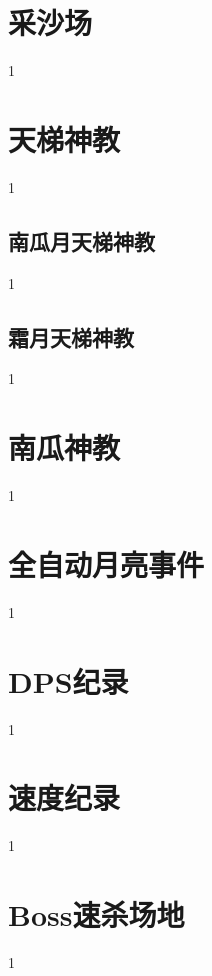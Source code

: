 \section{采沙场}
1



\section{天梯神教}
1
\subsection{南瓜月天梯神教}
1
\subsection{霜月天梯神教}
1

\section{南瓜神教}
1

\section{全自动月亮事件}
1

\section{DPS纪录}
1

\section{速度纪录}
1

\section{Boss速杀场地}
1
